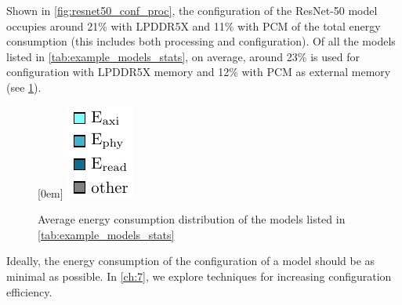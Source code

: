 Shown in \cref{fig:resnet50_conf_proc}, the configuration of the ResNet-50 model occupies around 21\% with LPDDR5X and 11\% with PCM of the total energy consumption (this includes both processing and configuration).
Of all the models listed in \cref{tab:example_models_stats}, on average, around 23\% is used for configuration with LPDDR5X memory and 12\% with PCM as external memory (see \cref{fig:example_models_avg_conf_proc}).

\begin{figure}[hbtp]
    \centering
    \hfill
    \subcaptionbox*{}[0em]{
        \includegraphics{assets/legend.pdf}
    }
    \hfill
    \caption{Average energy consumption distribution of the models listed in \cref{tab:example_models_stats}}
    \label{fig:example_models_avg_conf_proc}
\end{figure}

Ideally, the energy consumption of the configuration of a model should be as minimal as possible.
In \cref{ch:7}, we explore techniques for increasing configuration efficiency.


